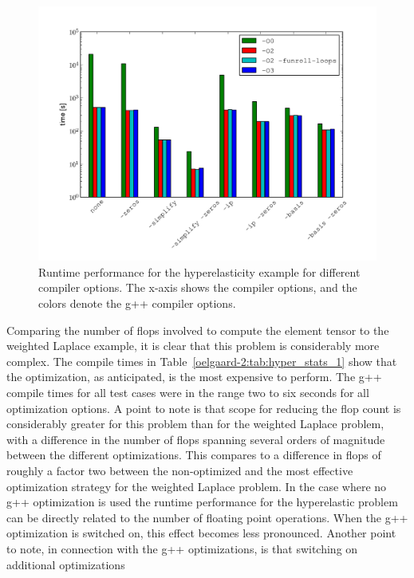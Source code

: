 \begin{figure}
  \center\includegraphics[width=\largefig]{chapters/oelgaard-2/pdf/runtime_hyperelasticity.pdf}
  \caption{Runtime performance for the hyperelasticity example for
           different compiler options.  The x-axis shows the \ffc{}
           compiler options, and the colors denote the g++ compiler
           options.}
  \label{oelgaard-2:fig:hyper_stats_2}
\end{figure}
%
Comparing the number of flops involved to compute the element
tensor to the weighted Laplace example, it is clear that this
problem is considerably more complex.  The \ffc{} compile times in
Table~\ref{oelgaard-2:tab:hyper_stats_1} show that the 
optimization, as anticipated, is the most expensive to perform.  The g++
compile times for all test cases were in the range two to six seconds for
all optimization options.  A point to note is that scope for reducing
the flop count is considerably greater for this problem than for the
weighted Laplace problem, with a difference in the number of flops
spanning several orders of magnitude between the different \ffc{}
optimizations.  This compares to a difference in flops of roughly a
factor two between the non-optimized and the most effective optimization
strategy for the weighted Laplace problem.  In the case where no g++
optimization is used the runtime performance for the hyperelastic problem
can be directly related to the number of floating point operations.
When the g++ optimization  is switched on, this effect
becomes less pronounced.  Another point to note, in connection with
the g++ optimizations, is that switching on additional optimizations
